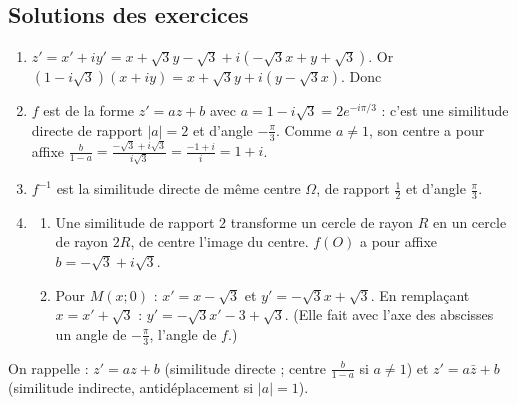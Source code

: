 \begin{corrige}
\section{Solutions des exercices}
\begin{sol}
\begin{enumerate}
      \item $z' = x' + iy' = x + \sqrt3 y - \sqrt3 + i(-\sqrt3 x + y + \sqrt3)$.
            Or $(1 - i\sqrt3)(x + iy) = x + \sqrt3 y + i(y - \sqrt3 x)$. Donc
      \item $f$ est de la forme $z' = az + b$ avec $a = 1 - i\sqrt3 = 2e^{-i\pi/3}$ : c'est une similitude directe de rapport $|a| = 2$ et d'angle $-\frac{\pi}{3}$.
            Comme $a \neq 1$, son centre a pour affixe
            $\frac{b}{1-a} = \frac{-\sqrt3 + i\sqrt3}{i\sqrt3} = \frac{-1 + i}{i} = 1 + i$. 
      \item $f^{-1}$ est la similitude directe de même centre $\Omega$, de rapport $\frac12$ et d'angle $\frac{\pi}{3}$.
      \item \begin{enumerate}
                  \item Une similitude de rapport $2$ transforme un cercle de rayon $R$ en un cercle de rayon $2R$, de centre l'image du centre.
                        $f(O)$ a pour affixe $b = -\sqrt3 + i\sqrt3$.
                  \item Pour $M(x;0)$ : $x' = x - \sqrt3$ et $y' = -\sqrt3 x + \sqrt3$. En remplaçant $x = x' + \sqrt3$ :
                        $y' = -\sqrt3 x' - 3 + \sqrt3$. 
                        (Elle fait avec l'axe des abscisses un angle de $-\frac{\pi}{3}$, l'angle de $f$.)
            \end{enumerate}
\end{enumerate}
\end{sol}
\begin{sol}
On rappelle : $z' = az + b$ (similitude directe ; centre $\frac{b}{1-a}$ si $a \neq 1$) et $z' = a\bar{z} + b$ (similitude indirecte, antidéplacement si $|a| = 1$).

\end{sol}
\end{corrige}
